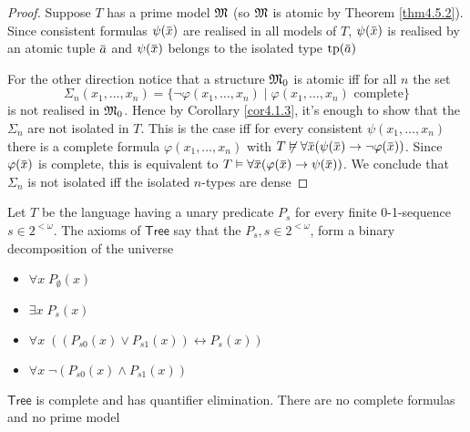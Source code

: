 \documentclass[11pt]{article}
\def \Tree {\textsf{Tree}}
\begin{document}
\begin{proof}
Suppose \(T\) has a prime model \(\mathfrak{M}\) (so \(\mathfrak{M}\) is atomic by Theorem \ref{thm4.5.2}). Since
consistent formulas \(\psi(\barx)\) are realised in all models of \(T\), \(\psi(\barx)\) is realised
by an atomic tuple \(\bara\) and \(\psi(\barx)\) belongs to the isolated type \(\tp(\bara)\)

For the other direction notice that a structure \(\mathfrak{M}_0\) is atomic iff for all \(n\) the set
\begin{equation*}
\Sigma_n(x_1,\dots,x_n)=\{\neg\varphi(x_1,\dots,x_n)\mid\varphi(x_1,\dots,x_n)\text{ complete}\}
\end{equation*}
is not realised in \(\mathfrak{M}_0\).
Hence by Corollary \ref{cor4.1.3}, it's enough to show that the \(\Sigma_n\) are not isolated in \(T\).
This is the case iff for every consistent \(\psi(x_1,\dots,x_n)\) there is a complete
formula \(\varphi(x_1,\dots,x_n)\) with \(T\not\vDash\forall\barx(\psi(\barx)\to\neg\varphi(\barx))\).
Since \(\varphi(\barx)\) is
complete, this is equivalent to \(T\vDash\forall\barx(\varphi(\barx)\to\psi(\barx))\). We conclude that \(\Sigma_n\) is not
isolated iff the isolated \(n\)-types are dense
\end{proof}



\begin{examplle}[]
Let \(T\) be the language having a unary predicate \(P_s\) for every finite
0-1-sequence \(s\in 2^{<\omega}\). The axioms of \(\Tree\) say that the \(P_s,s\in 2^{<\omega}\), form a
binary decomposition of the universe
\begin{itemize}
\item \(\forall x\;P_\emptyset(x)\)
\item \(\exists x\;P_s(x)\)
\item \(\forall x\;((P_{s0}(x)\vee P_{s1}(x))\leftrightarrow P_s(x))\)
\item \(\forall x\;\neg(P_{s0}(x)\wedge P_{s1}(x))\)
\end{itemize}


\(\Tree\) is complete and has quantifier elimination. There are no complete formulas and no
prime model
\end{examplle}
\end{document}
